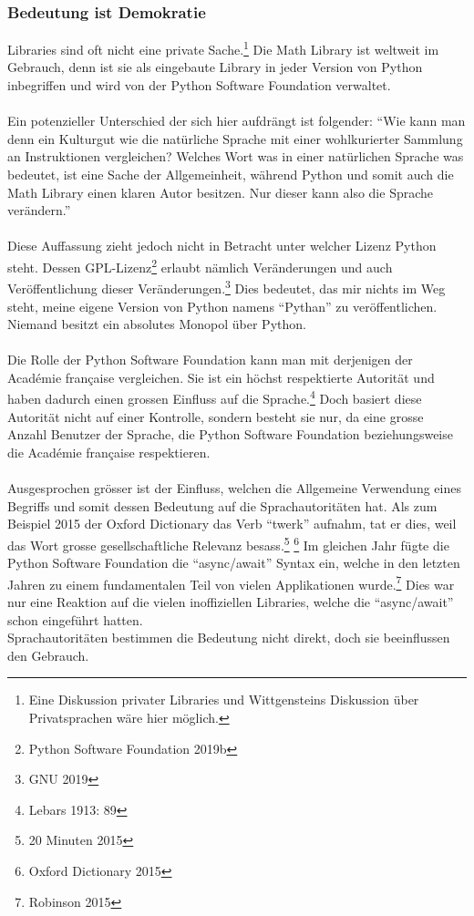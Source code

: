 \documentclass[10pt,a4paper]{article}
\begin{document}
\subsubsection{Bedeutung ist Demokratie}
Libraries sind oft nicht eine private Sache.\footnote{Eine Diskussion privater Libraries und Wittgensteins Diskussion über Privatsprachen wäre hier möglich.} Die Math Library ist weltweit im Gebrauch, denn ist sie als eingebaute Library in jeder Version von Python inbegriffen und wird von der Python Software Foundation verwaltet. \\
\\
Ein potenzieller Unterschied der sich hier aufdrängt ist folgender: \enquote{Wie kann man denn ein Kulturgut wie die natürliche Sprache mit einer wohlkurierter Sammlung an Instruktionen vergleichen? Welches Wort was in einer natürlichen Sprache was bedeutet, ist eine Sache der Allgemeinheit, während Python und somit auch die Math Library einen klaren Autor besitzen. Nur dieser kann also die Sprache verändern.} \\
\\
Diese Auffassung zieht jedoch nicht in Betracht unter welcher Lizenz Python steht. Dessen GPL-Lizenz\footnote{Python Software Foundation 2019b} erlaubt nämlich Veränderungen und auch Veröffentlichung dieser Veränderungen.\footnote{GNU 2019} Dies bedeutet, das mir nichts im Weg steht, meine eigene Version von Python namens \enquote{Pythan} zu veröffentlichen. Niemand besitzt ein absolutes Monopol über Python. \\
\\
Die Rolle der Python Software Foundation kann man mit derjenigen der Académie française vergleichen. Sie ist ein höchst respektierte Autorität und haben dadurch einen grossen Einfluss auf die Sprache.\footnote{Lebars 1913: 89} Doch basiert diese Autorität nicht auf einer Kontrolle, sondern besteht sie nur, da eine grosse Anzahl Benutzer der Sprache, die Python Software Foundation beziehungsweise die Académie française respektieren. \\
\\
Ausgesprochen grösser ist der Einfluss, welchen die Allgemeine Verwendung eines Begriffs und somit dessen Bedeutung auf die Sprachautoritäten hat. Als zum Beispiel 2015 der Oxford Dictionary das Verb \enquote{twerk} aufnahm, tat er dies, weil das Wort grosse gesellschaftliche Relevanz besass.\footnote{20 Minuten 2015} \footnote{Oxford Dictionary 2015} Im gleichen Jahr fügte die Python Software Foundation die \enquote{async/await} Syntax ein, welche in den letzten Jahren zu einem fundamentalen Teil von vielen Applikationen wurde.\footnote{Robinson 2015} Dies war nur eine Reaktion auf die vielen inoffiziellen Libraries, welche die \enquote{async/await} schon eingeführt hatten. \\
Sprachautoritäten bestimmen die Bedeutung nicht direkt, doch sie beeinflussen den Gebrauch.
\end{document}
